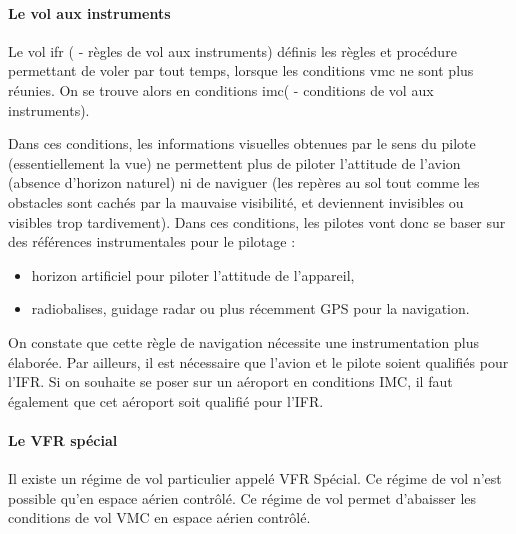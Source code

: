 		\paragraph{Le vol aux instruments}
		Le vol \acrshort{ifr} ( - règles de vol aux instruments) définis les règles et procédure permettant de voler par tout temps, lorsque les conditions \acrshort{vmc} ne sont plus réunies. On se trouve alors en conditions \acrshort{imc}( - conditions de vol aux instruments).
		
		Dans ces conditions, les informations visuelles obtenues par le sens du pilote (essentiellement la vue) ne permettent plus de piloter l'attitude de l'avion (absence d'horizon naturel) ni de naviguer (les repères au sol tout comme les obstacles sont cachés par la mauvaise visibilité, et deviennent invisibles ou visibles trop tardivement). Dans ces conditions, les pilotes vont donc se baser sur des références instrumentales pour le pilotage :
		\begin{itemize}
		\item horizon artificiel pour piloter l'attitude de l'appareil,
		\item radiobalises, guidage radar ou plus récemment GPS pour la navigation.
		\end{itemize}
		
		On constate que cette règle de navigation nécessite une instrumentation plus élaborée. Par ailleurs, il est nécessaire que l'avion et le pilote soient qualifiés pour l'IFR. Si on souhaite se poser sur un aéroport en conditions IMC, il faut également que cet aéroport soit qualifié pour l'IFR.
		
		
		
		\paragraph{Le VFR spécial} 
		Il existe un régime de vol particulier appelé VFR Spécial. Ce régime de vol n'est possible qu'en espace aérien contrôlé. Ce régime de vol permet d'abaisser les conditions de vol VMC en espace aérien contrôlé.
		
